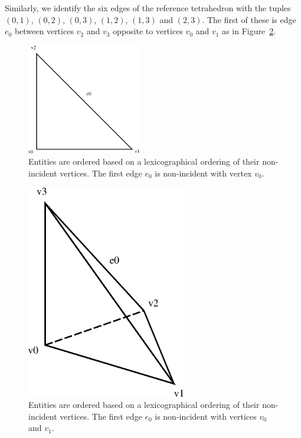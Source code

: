 Similarly, we identify the six edges of the reference tetrahedron with
the tuples $(0, 1)$, $(0, 2)$, $(0, 3)$, $(1, 2)$, $(1, 3)$ and $(2,
3)$. The first of these is edge $e_0$ between vertices $v_2$ and $v_3$
opposite to vertices $v_0$ and $v_1$ as in Figure~\ref{fig:orderingexample,tetrahedron}.

\begin{figure}[H]
  \begin{center}
    \includegraphics[width=5cm]{eps/ordering_example_triangle.eps}
    \caption{Entities are ordered based on a lexicographical ordering
      of their non-incident vertices. The first edge $e_0$ is non-incident
      with vertex $v_0$.}
    \label{fig:orderingexample,triangle}
  \end{center}
\end{figure}

\begin{figure}[H]
  \begin{center}
    \includegraphics[width=7cm]{eps/ordering_example_tetrahedron.eps}
    \caption{Entities are ordered based on a lexicographical ordering
      of their non-incident vertices. The first edge $e_0$ is non-incident
      with vertices $v_0$ and $v_1$.}
    \label{fig:orderingexample,tetrahedron}
  \end{center}
\end{figure}

